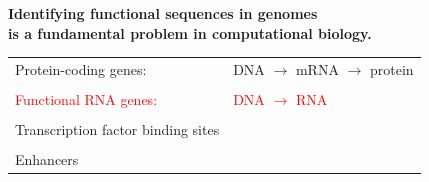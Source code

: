 \documentclass[landscape]{slides}
\begin{document}
\begin{slide}
\begin{center}
\textbf{Identifying functional sequences in genomes \\
  is a fundamental problem in computational biology.}
\end{center}
\medskip

\begin{center}
\begin{tabular}{ll}
Protein-coding genes: & DNA $\rightarrow$ mRNA $\rightarrow$ protein \\
& \\
\textcolor{red}{Functional RNA genes:} & \textcolor{red}{DNA  $\rightarrow$ RNA} \\
& \\
Transcription factor binding sites & \\
& \\
Enhancers & \\
\end{tabular}
\end{center}

\vfill
\end{slide}
\end{document}
